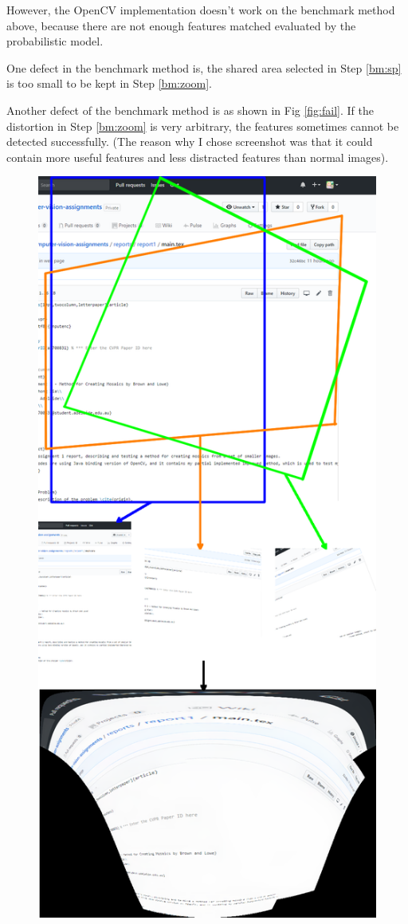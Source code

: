 \documentclass[10pt,twocolumn,letterpaper]{article}
\begin{document}
However, the OpenCV implementation doesn't work on the benchmark method above, because there are not enough features matched evaluated by the probabilistic model.

One defect in the benchmark method is, the shared area selected in Step \ref{bm:sp} is too small to be kept in Step \ref{bm:zoom}.

Another defect of the benchmark method is as shown in Fig \ref{fig:fail}.
If the distortion in Step \ref{bm:zoom} is very arbitrary, the features sometimes cannot be detected successfully.
(The reason why I chose screenshot was that it could contain more useful features and less distracted features than normal images).

\begin{figure}[t]
    \begin{center}
        \includegraphics[width=0.9\linewidth]{fail}

\end{center}
\end{figure}
\end{document}
